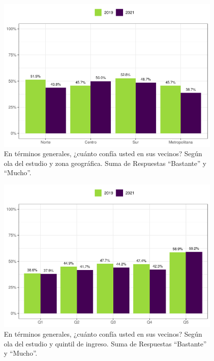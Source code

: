 \documentclass[
  12pt,
]{book}
\begin{document}
\begin{figure}

{\centering \includegraphics{reporte-elsoc_files/figure-latex/vecinos-zona-1} 

}

\caption{En términos generales, ¿cuánto confía usted en sus vecinos? Según ola del estudio y zona geográfica. Suma de Respuestas “Bastante” y “Mucho”.}\label{fig:vecinos-zona}
\end{figure}

\begin{figure}

{\centering \includegraphics{reporte-elsoc_files/figure-latex/vecinos-quintil-1} 

}

\caption{En términos generales, ¿cuánto confía usted en sus vecinos? Según ola del estudio y quintil de ingreso. Suma de Respuestas “Bastante” y “Mucho”.}\label{fig:vecinos-quintil}
\end{figure}
\end{document}
